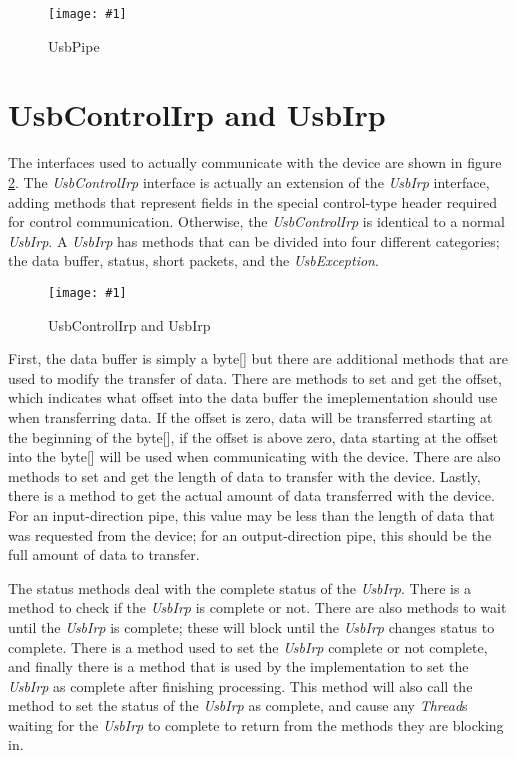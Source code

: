 \documentclass{article}
\newcommand{\myclass}[1]{\emph{#1}}
\newcommand{\myinterface}[1]{\emph{#1}}
\newcommand{\mysectionend}[0]{\vfill\pagebreak[1]}
\newcommand{\myfigure}[3]{\begin{figure}[htbp]\centering\texttt{[image: \#1]}\caption{#2}\label{#3}\end{figure}}
\begin{document}
\myfigure{figs/UsbPipe}{UsbPipe}{UsbPipe}

\mysectionend

%

\section{UsbControlIrp and UsbIrp}

The interfaces used to actually communicate with the device are shown in
figure \ref{UsbIrps}.  The \myinterface{UsbControlIrp} interface is actually an extension
of the \myinterface{UsbIrp} interface, adding methods that represent fields in the special
control-type header required for control communication.  Otherwise, the
\myinterface{UsbControlIrp} is identical to a normal \myinterface{UsbIrp}.  A \myinterface{UsbIrp} has methods that
can be divided into four different categories; the data buffer, status,
short packets, and the \myclass{UsbException}.

\myfigure{figs/UsbIrps}{UsbControlIrp and UsbIrp}{UsbIrps}

First, the data buffer is simply a byte[] but there are additional methods that
are used to modify the transfer of data.  There are methods to set and get the
offset, which indicates what offset into the data buffer the imeplementation
should use when transferring data.  If the offset is zero, data will be transferred
starting at the beginning of the byte[], if the offset is above zero, data starting
at the offset into the byte[] will be used when communicating with the device.
There are also methods to set and get the length of data to transfer with the device.
Lastly, there is a method to get the actual amount of data transferred with the device.
For an input-direction pipe, this value may be less than the length of data that was
requested from the device; for an output-direction pipe, this should be the full
amount of data to transfer.

The status methods deal with the complete status of the \myinterface{UsbIrp}.  There is a method to
check if the \myinterface{UsbIrp} is complete or not.  There are also methods to wait until the \myinterface{UsbIrp}
is complete; these will block until the \myinterface{UsbIrp} changes status to complete.  There
is a method used to set the \myinterface{UsbIrp} complete or not complete, and finally there is a
method that is used by the implementation to set the \myinterface{UsbIrp} as complete after finishing
processing.  This method will also call the method to set the status of the \myinterface{UsbIrp} as
complete, and cause any \myclass{Thread}s waiting for the \myinterface{UsbIrp} to complete to return from
the methods they are blocking in.
\end{document}
